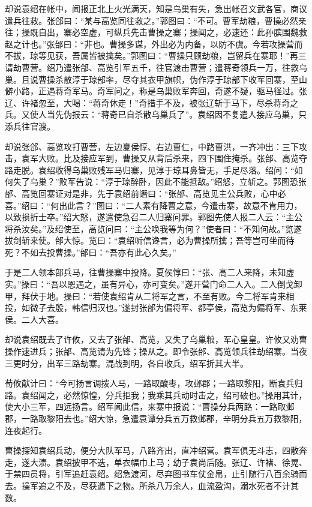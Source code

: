 却说袁绍在帐中，闻报正北上火光满天，知是乌巢有失，急出帐召文武各官，商议遣兵往救。张郃曰：“某与高览同往救之。”郭图曰：“不可。曹军劫粮，曹操必然亲往；操既自出，寨必空虚，可纵兵先击曹操之寨；操闻之，必速还：此孙膑围魏救赵之计也。”张邰曰：“非也。曹操多谋，外出必为内备，以防不虞。今若攻操营而不拔，琼等见获，吾属皆被擒矣。”郭图曰：“曹操只顾劫粮，岂留兵在寨耶！”再三请劫曹营。绍乃遣张郃、高览引军五千，往官渡击曹营；遣蒋奇领兵一万，往救乌巢。且说曹操杀散淳于琼部率，尽夺其衣甲旗帜，伪作淳于琼部下收军回寨，至山僻小路，正遇蒋奇军马。奇军问之，称是乌巢败军奔回，奇遂不疑，驱马径过。张辽、许褚忽至，大喝：“蒋奇休走！”奇措手不及，被张辽斩于马下，尽杀蒋奇之兵。又使人当先伪报云：“蒋奇已自杀散乌巢兵了”。袁绍因不复遣人接应乌巢，只添兵往官渡。

却说张郃、高览攻打曹营，左边夏侯惇、右边曹仁，中路曹洪，一齐冲出：三下攻击，袁军大败。比及接应军到，曹操又从背后杀来，四下围住掩杀。张邰、高览夺路走脱。袁绍收得乌巢败残军马归寨，见淳于琼耳鼻皆无，手足尽落。绍问：“如何失了乌巢？”败军告说：“淳于琼醉卧，因此不能抵敌。”绍怒，立斩之。郭图恐张邰、高览回寨证对是非，先于袁绍前谮曰：“张邰、高览见主公兵败，心中必喜。”绍曰：“何出此言？”图曰：“二人素有降曹之意，今遣击寨，故意不肯用力，以致损折士卒。”绍大怒，遂遣使急召二人归寨问罪。郭图先使人报二人云：“主公将杀汝矣。”及绍使至，高览问曰：“主公唤我等为何？”使者曰：“不知何故。”览遂拔剑斩来使。邰大惊。览曰：“袁绍听信谗言，必为曹操所擒；吾等岂可坐而待死？不如去投曹操。”邰曰：“吾亦有此心久矣。”

于是二人领本部兵马，往曹操寨中投降。夏侯惇曰：“张、高二人来降，未知虚实。”操曰：“吾以恩遇之，虽有异心，亦可变矣。”遂开营门命二人入。二人倒戈卸甲，拜伏于地。操曰：“若使袁绍肯从二将军之言，不至有败。今二将军肯来相投，如微子去殷，韩信归汉也。”遂封张邰为偏将军、都亭侯，高览为偏将军、东莱侯。二人大喜。

却说袁绍既去了许攸，又去了张邰、高览，又失了乌巢粮，军心皇皇。许攸又劝曹操作速进兵；张邰、高览请为先锋；操从之。即令张邰、高览领兵往劫绍寨。当夜三更时分，出军三路劫寨。混战到明，各自收兵，绍军折其大半。

荀攸献计曰：“今可扬言调拨人马，一路取酸枣，攻邺郡；一路取黎阳，断袁兵归路。袁绍闻之，必然惊惶，分兵拒我；我乘其兵动时击之，绍可破也。”操用其计，使大小三军，四远扬言。绍军闻此信，来寨中报说：“曹操分兵两路：一路取邺郡，一路取黎阳去也。”绍大惊，急遣袁谭分兵五万救邺郡，辛明分兵五万救黎阳，连夜起行。

曹操探知袁绍兵动，便分大队军马，八路齐出，直冲绍营。袁军俱无斗志，四散奔走，遂大溃。袁绍披甲不迭，单衣幅巾上马；幼子袁尚后随。张辽、许褚、徐晃、于禁四员将，引军追赶袁绍。绍急渡河，尽弃图书车仗金帛，止引随行八百余骑而去。操军追之不及，尽获遗下之物。所杀八万余人，血流盈沟，溺水死者不计其数。

